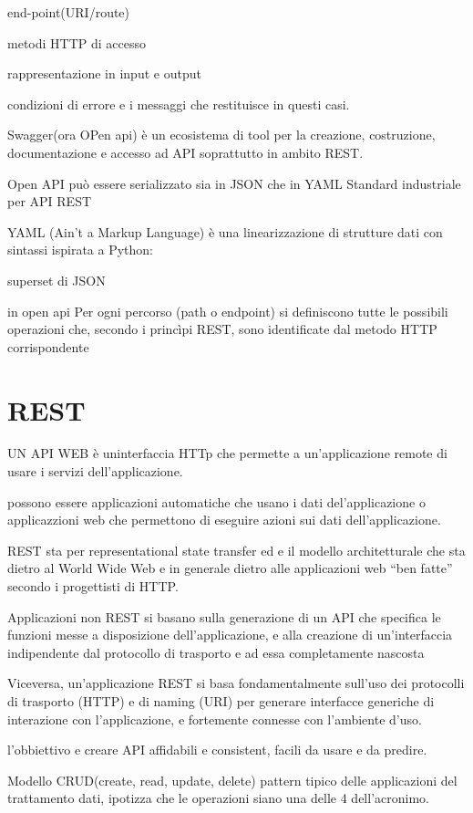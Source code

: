 \documentclass[12pt]{article}
\begin{document}
end-point(URI/route)

metodi HTTP di accesso

rappresentazione in input e output

condizioni di errore e i messaggi che restituisce in questi casi.

Swagger(ora OPen api) è un ecosistema di tool per la creazione, costruzione,
documentazione e accesso ad API soprattutto in ambito REST.

Open API può essere serializzato sia in JSON che in YAML
Standard industriale per API REST

YAML (Ain't a Markup Language) è una linearizzazione di
strutture dati con sintassi ispirata a Python:

superset di JSON

in open api
Per ogni percorso (path o endpoint) si definiscono tutte
le possibili operazioni che, secondo i princìpi REST,
sono identificate dal metodo HTTP corrispondente

\section{REST}


UN API WEB è uninterfaccia HTTp che permette a un'applicazione remote di usare i servizi dell'applicazione.

possono essere applicazioni automatiche che usano i dati del'applicazione o applicazzioni web che permettono di eseguire azioni sui dati dell'applicazione.

REST sta per representational state transfer ed e il modello
architetturale che sta dietro al World Wide Web e in generale dietro alle
applicazioni web “ben fatte” secondo i progettisti di HTTP.

Applicazioni non REST si basano sulla generazione di un API che
specifica le funzioni messe a disposizione dell’applicazione, e alla
creazione di un’interfaccia indipendente dal protocollo di trasporto e ad
essa completamente nascosta

Viceversa, un’applicazione REST si basa fondamentalmente sull’uso
dei protocolli di trasporto (HTTP) e di naming (URI) per generare
interfacce generiche di interazione con l’applicazione, e fortemente
connesse con l’ambiente d’uso.

l'obbiettivo e creare API affidabili e consistent, facili da usare e da predire.

Modello CRUD(create, read, update, delete) pattern tipico delle applicazioni del trattamento dati, ipotizza che le operazioni siano una delle 4 dell'acronimo.
\end{document}
